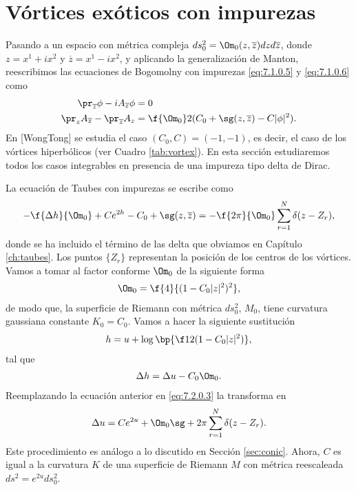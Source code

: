\section{Vórtices exóticos con impurezas}

Pasando a un espacio con métrica compleja $ds_0^2 = \Om_0(z,\overline z) dzd\overline z$, donde $z=x^1+ix^2$ y $\overline z=x^1-ix^2$, y aplicando la generalización de Manton, reescribimos las ecuaciones de Bogomolny con impurezas \eqref{eq:7.1.0.5} y \eqref{eq:7.1.0.6} como
\begin{align}
	\pr_{\overline z}\phi-iA_{\overline z}\phi &= 0\\
	\pr_z A_{\overline z}-\pr_{\overline z}A_z &= \f{\Om_0}2(C_0+\sg(z,\overline z)-C|\phi|^2).
\end{align}
En [WongTong] se estudia el caso $(C_0,C)=(-1,-1)$, es decir, el caso de los vórtices hiperbólicos (ver Cuadro \ref{tab:vortex}). En esta sección estudiaremos todos los casos integrables en presencia de una impureza tipo delta de Dirac.

La ecuación de Taubes con impurezas se escribe como
\begin{align}
	-\f{\Delta h}{\Om_0}+C e^{2h}-C_0+\sg(z,\overline z) = -\f{2\pi}{\Om_0}\sum_{r=1}^N\delta(z-Z_r), \label{eq:7.2.0.3}
\end{align}
donde se ha incluido el término de las delta que obviamos en Capítulo \ref{ch:taubes}. Los puntos $\{Z_r\}$ representan la posición de los centros de los vórtices. Vamos a tomar al factor conforme $\Om_0$ de la siguiente forma
\begin{align}
	\Om_0 = \f{4}{(1-C_0|z|^2)^2},
\end{align}
de modo que, la superficie de Riemann con métrica $ds_0^2$, $M_0$, tiene curvatura gaussiana constante $K_0 = C_0$. Vamos a hacer la siguiente sustitución
\begin{align}
	h = u+\log\bp{\f 12(1-C_0|z|^2)},
\end{align}
tal que
\begin{align}
	\Delta h = \Delta u-C_0\Om_0.
\end{align}
Reemplazando la ecuación anterior en \eqref{eq:7.2.0.3} la transforma en
\begin{align}
	\Delta u = Ce^{2u}+\Om_0\sg+2\pi\sum_{r=1}^N\delta(z-Z_r). \label{eq:7.2.0.7}
\end{align}
Este procedimiento es análogo a lo discutido en Sección \ref{sec:conic}. Ahora, $C$ es igual a la curvatura $K$ de una superficie de Riemann $M$ con métrica reescaleada $ds^2 = e^{2u}ds_0^2$.

